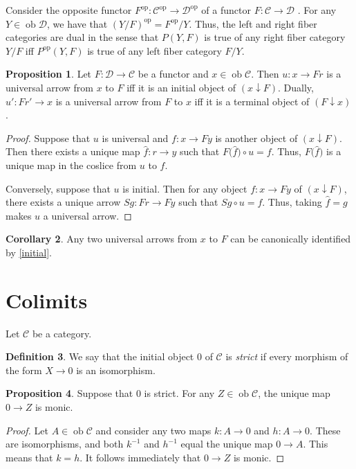 \documentclass[10pt,letterpaper,cm]{nupset}
\theoremstyle{definition}
\newtheorem{definition}{Definition}[section]
\theoremstyle{theorem}
\newtheorem{corollary}[definition]{Corollary}
\newtheorem{prop}[definition]{Proposition}
\theoremstyle{remark}
\newcommand{\1}{\mathbf{1}}
\renewcommand{\c}{\mathscr{C}}
\renewcommand{\d}{\mathscr{D}}
\newcommand{\0}{\vec 0}
\DeclareMathOperator{\op}{op}
\DeclareMathOperator{\ob}{ob}
\begin{document}
\smallskip

Consider the opposite functor $F^{\op}: \c^{\op} \to \d^{\op}$ of a functor $F: \c \to \d$ . For any $Y \in \ob \d$, we have that $\left(Y/F\right)^{\op} = {F^{\op}}/{Y}$. Thus, the left and right fiber categories are dual in the sense that $P(Y, F)$ is true of any right fiber category ${Y}/{F}$ iff $P^{\op}(Y, F)$ is true of any left fiber category ${F}/{Y}$. 

\smallskip

\begin{prop}
Let $F : \d \to \c$ be a functor and $x \in \ob{\c}$. Then $u : x \to Fr$ is a universal arrow from $x$ to $F$ iff it is an initial object of  $\left(x \downarrow F\right)$. Dually, $u' : Fr' \to x$ is a universal arrow from $F$ to $x$  iff it is a terminal object of $\left(F \downarrow x\right)$.
\end{prop}
\begin{proof}
Suppose that $u$ is universal and $f: x \to Fy$ is another object of $\left(x \downarrow F\right)$. Then there exists a unique map $\hat{f}: r \to y$ such that $F\big(\hat{f}\big) \circ u = f$. Thus, $F\big(\hat{f}\big)$ is a unique map in the coslice from $u$ to $f$.

\smallskip

Conversely, suppose that $u$ is initial. Then for any object $f: x \to Fy$ of $\left(x \downarrow F\right)$, there exists a unique arrow $Sg : Fr \to Fy$ such that $Sg \circ u = f$. Thus, taking $\hat{f} = g$ makes $u$ a universal arrow.
\end{proof}

\begin{corollary}
Any two universal arrows from $x$ to $F$ can be canonically identified by \cref{initial}.
\end{corollary}

\section{Colimits}

Let $\c$ be a category.

\begin{definition}
We say that the initial object $0$ of  $\c$ is \textit{strict} if every morphism of the form $X \to 0$ is an isomorphism.
\end{definition}

\begin{prop}
Suppose that $0$ is strict. For any $Z \in \ob{\c}$, the unique map $0 \to Z$ is monic.
\end{prop}
\begin{proof}
Let $A \in \ob{\c}$ and consider any two maps $k: A \to 0$ and $h : A \to 0$. These are isomorphisms, and both $k^{-1}$ and $h^{-1}$ equal the unique map $0 \to A$. This means that $k = h$. It follows immediately that $0 \to Z$ is monic.
\end{proof}
\end{document}
